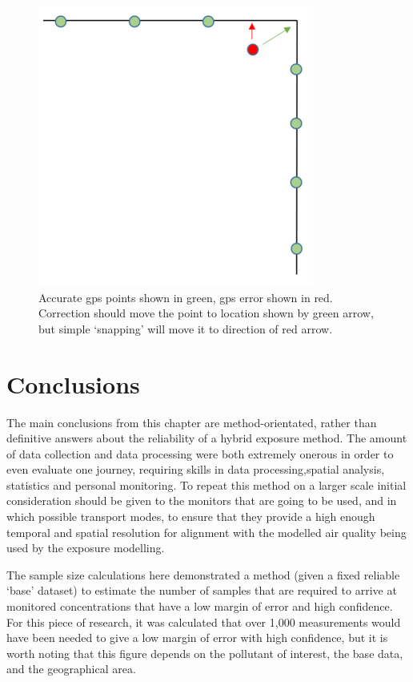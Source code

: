 \begin{figure}[H]
\centering
\includegraphics[scale=0.7]{images/gps_snapping_error.png}
\caption{Accurate \gls{gps} points shown in green, \gls{gps} error shown in red. Correction should move the point to location shown by green arrow, but simple ‘snapping’ will move it to direction of red arrow.}
\label{fig:gps_snapping_error}
\end{figure}

\section{Conclusions}
\label{sec:4conclusions}

The main conclusions from this chapter are method-orientated, rather than definitive answers about the reliability of a hybrid exposure method. The amount of data collection and data processing were both extremely onerous in order to even evaluate one journey, requiring skills in data processing,spatial analysis, statistics and personal monitoring. To repeat this method on a larger scale initial consideration should be given to the monitors that are going to be used, and in which possible transport modes, to ensure that they provide a high enough temporal and spatial resolution for alignment with the modelled air quality being used by the exposure modelling.

The sample size calculations here demonstrated a method (given a fixed reliable ‘base’ dataset) to estimate the number of samples that are required to arrive at monitored concentrations that have a low margin of error and high confidence. For this piece of research, it was calculated that over 1,000 measurements would have been needed to give a low margin of error with high confidence, but it is worth noting that this figure depends on the pollutant of interest, the base data, and the geographical area.

